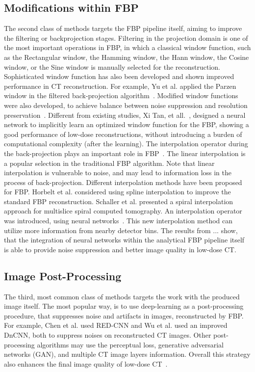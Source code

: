 \documentclass[12pt,a4paper]{article}
\begin{document}
\subsection{Modifications within FBP}
The second class of methods targets the FBP pipeline itself, aiming to improve the filtering or backprojection stages. Filtering in the projection domain is one of the most important operations in FBP, in which a classical window function, such as the Rectangular window, the Hamming window, the Hann window, the Cosine window, or the Sine window is manually selected for the reconstruction. Sophisticated window function has also been developed and shown improved performance in CT reconstruction.
For example, Yu et al. applied the Parzen window in the
filtered back-projection algorithm~\cite{DeepFBP_CT}. Modified window functions were also developed, to achieve balance between noise suppression and resolution preservation~\cite{DeepFBP_CT}. Different from existing studies, Xi Tan, et all.~\cite{DeepFBP_CT}, designed a neural network to implicitly learn an optimized window function for the FBP, showing a good performance of low-dose reconstructions, without introducing a burden of computational complexity (after the learning). 
\newline\newline
The interpolation operator during the back-projection plays an important role in FBP~\cite{DeepFBP_CT}. The linear interpolation is a popular selection in the traditional FBP algorithm. Note that linear interpolation is vulnerable to noise, and may lead to information loss in the process of back-projection. Different interpolation methods have been proposed for FBP. Horbelt et al. considered using spline interpolation to improve the standard FBP reconstruction. Schaller et al. presented a spiral interpolation approach for multislice spiral computed tomography. An interpolation operator was introduced, using neural networks~\cite{DeepFBP_CT}. This new interpolation method can utilize more information from nearby detector bins. The results from ... show, that the integration of neural networks within the analytical FBP pipeline itself is able to provide noise suppression and better image quality in low-dose CT. 
\subsection{Image Post-Processing}
The third, most common class of methods targets the work with the produced image itself. The most popular way, is to use deep-learning as a post-processing procedure, that suppresses noise and artifacts in images, reconstructed by FBP. For example, Chen et al. used RED-CNN and Wu et al. used an improved DnCNN,
both to suppress noises on reconstructed CT images. Other
post-processing algorithms may use the perceptual loss, generative adversarial networks (GAN), and
multiple CT image layers information. Overall this strategy also enhances the final image quality of low-dose CT~\cite{DeepFBP_CT}.
\end{document}
